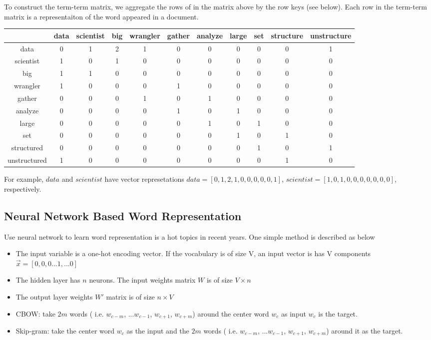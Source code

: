 \documentclass[12pt, oneside]{article}
\begin{document}
To construct the term-term matrix, we aggregate the rows of in the matrix above by the row keys (see below). Each row in the term-term matrix is a representaiton of the word appeared in a document.

\begin{tabular}{c c c c c c c c c c c} 
 \hline
   & data &scientist &big &wrangler &gather &analyze &large &set &structure &unstructure\\ [0.5ex] 
 \hline\hline
 data & 0 &1 &2 &1 &0 &0 &0 &0 &0 &1\\ 
 \hline
 scientist & 1 &0 &1 &0 &0 &0 &0 &0 &0 &0\\
 \hline
 big  & 1 &1 &0 &0 &0 &0 &0 &0 &0 &0\\
 \hline
 wrangler & 1 &0 &0 &0 &1 &0 &0 &0 &0 &0\\
 \hline
 gather& 0 &0 &0 &1 &0 &1 &0 &0 &0 &0\\
 \hline
 analyze& 0 &0 &0 &0 &1 &0 &1 &0 &0 &0\\
 \hline
 large& 0 &0 &0 &0 &0 &1 &0 &1 &0 &0\\
 \hline
 set& 0 &0 &0 &0 &0 &0 &1 &0 &1 &0\\
 \hline
 structured& 0 &0 &0 &0 &0 &0 &0 &1 &0 &1\\
 \hline
 unstructured& 1 &0 &0 &0 &0 &0 &0 &0 &1 &0\\
 \hline 
 \hline
\end{tabular}

For example, $data$ and $scientist$ have vector represetations $data=[0, 1, 2, 1, 0, 0, 0, 0, 0, 1]$, $scientist=[1, 0, 1, 0, 0, 0, 0, 0, 0, 0]$, respectively.


\subsection{Neural Network Based Word Representation}

Use neural network to learn word representation is a hot topics in recent years. One simple method is described as below

\begin{itemize}

\item The input variable is a one-hot encoding vector. If the vocabulary is of size V, an input vector is has V components ${\vec{x}=[0, 0, 0 ...1, ...0]}$ 
\item The hidden layer has $n$ neurons. The input weights matrix ${W}$ is of size ${V\times n}$
\item The output layer weights ${W}'$ matrix is of size ${n\times V}$
\item CBOW: take $2m$ words ( i.e. ${w_{c-m}}$, ...${w_{c-1}}$, ${w_{c+1}}$, ${w_{c+m}}$) around the center word ${w_c}$ as input  ${w_c}$ is the target.
\item Skip-gram: take the center word ${w_c}$ as the input and the $2m$ words ( i.e. ${w_{c-m}}$, ...${w_{c-1}}$, ${w_{c+1}}$, ${w_{c+m}}$) around it as the target.

\end{itemize}
\end{document}
